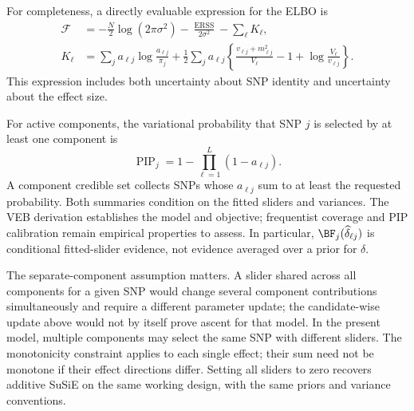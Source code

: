 For completeness, a directly evaluable expression for the ELBO is
\begin{align}
\mathcal F
 &=-\frac N2\log(2\pi\sigma^2)
   -\frac{\operatorname{ERSS}}{2\sigma^2}
   -\sum_\ell K_\ell,\nonumber\\
K_\ell
 &=\sum_j a_{\ell j}\log\frac{a_{\ell j}}{\pi_j}
  +\frac12\sum_j a_{\ell j}
   \left\{\frac{v_{\ell j}+m_{\ell j}^2}{V_\ell}
                -1+\log\frac{V_\ell}{v_{\ell j}}\right\}.
\label{eq:veb-computable-elbo}
\end{align}
This expression includes both uncertainty about SNP identity and
uncertainty about the effect size.

For active components, the variational probability that SNP $j$
is selected by at least one component is
\begin{equation}
\operatorname{PIP}_j
  =1-\prod_{\ell=1}^L(1-a_{\ell j}).
\label{eq:veb-pip}
\end{equation}
A component credible set collects SNPs whose $a_{\ell j}$ sum to
at least the requested probability. Both summaries condition on
the fitted sliders and variances. The VEB derivation establishes
the model and objective; frequentist coverage and PIP calibration
remain empirical properties to assess. In particular,
$\BF_j(\widehat\delta_{\ell j})$ is conditional fitted-slider
evidence, not evidence averaged over a prior for $\delta$.

The separate-component assumption matters. A slider shared across
all components for a given SNP would change several component
contributions simultaneously and require a different parameter
update; the candidate-wise update above would not by itself prove
ascent for that model. In the present model, multiple components
may select the same SNP with different sliders. The monotonicity
constraint applies to each single effect; their sum need not be
monotone if their effect directions differ. Setting all sliders to
zero recovers additive SuSiE on the same working design, with the
same priors and variance conventions.
